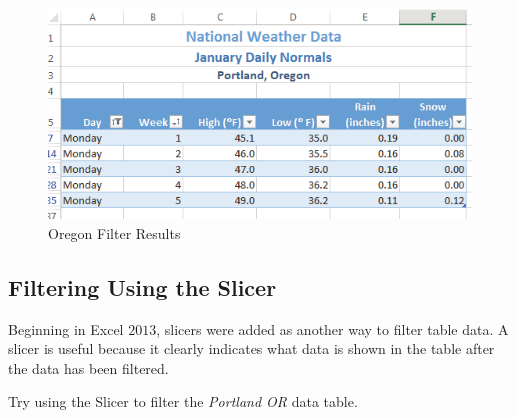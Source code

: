 \begin{figure}[H]
	\centering
	\includegraphics[width=\maxwidth{.95\linewidth}]{gfx/ch05_fig19}
	\caption{Oregon Filter Results}
	\label{05:fig19}
\end{figure}

\subsection{Filtering Using the Slicer}

Beginning in Excel $ 2013 $, slicers were added as another way to filter table data. A slicer is useful because it clearly indicates what data is shown in the table after the data has been filtered.

Try using the Slicer to filter the \textit{Portland OR} data table.


